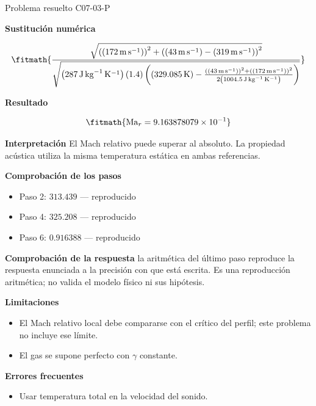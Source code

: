 \documentclass[10pt,openany]{book}
\begin{document}
\begin{studiumworked}{Problema resuelto C07-03-P}


\noindent\textbf{Sustitución numérica}

\[
\fitmath{\frac{\sqrt{\left(\left(172\,\mathrm{m}\,\mathrm{s}^{-1}\right)\right)^{2} + \left(\left(43\,\mathrm{m}\,\mathrm{s}^{-1}\right) - \left(319\,\mathrm{m}\,\mathrm{s}^{-1}\right)\right)^{2}}}{\sqrt{\left(287\,\mathrm{J}\,\mathrm{kg}^{-1}\,\mathrm{K}^{-1}\right) \left(1.4\right) \left(\left(329.085\,\mathrm{K}\right) - \frac{\left(\left(43\,\mathrm{m}\,\mathrm{s}^{-1}\right)\right)^{2} + \left(\left(172\,\mathrm{m}\,\mathrm{s}^{-1}\right)\right)^{2}}{2 \left(1004.5\,\mathrm{J}\,\mathrm{kg}^{-1}\,\mathrm{K}^{-1}\right)}\right)}}}
\]

\noindent\textbf{Resultado}

\[
\fitmath{\mathrm{Ma}_r=9.163878079\times10^{-1}}
\]

\noindent\textbf{Interpretación}
El Mach relativo puede superar al absoluto. La propiedad acústica utiliza la misma temperatura estática en ambas referencias.

\noindent\textbf{Comprobación de los pasos}
\begin{itemize}
\item Paso 2: $313.439$ — reproducido
\item Paso 4: $325.208$ — reproducido
\item Paso 6: $0.916388$ — reproducido
\end{itemize}

\noindent\textbf{Comprobación de la respuesta} la aritmética del último paso reproduce la respuesta enunciada a la precisión con que está escrita. Es una reproducción aritmética; no valida el modelo físico ni sus hipótesis.

\noindent\textbf{Limitaciones}
\begin{itemize}
\item El Mach relativo local debe compararse con el crítico del perfil; este problema no incluye ese límite.
\item El gas se supone perfecto con $\gamma$ constante.
\end{itemize}

\noindent\textbf{Errores frecuentes}
\begin{itemize}
\item Usar temperatura total en la velocidad del sonido.
\end{itemize}
\end{studiumworked}
\end{document}
